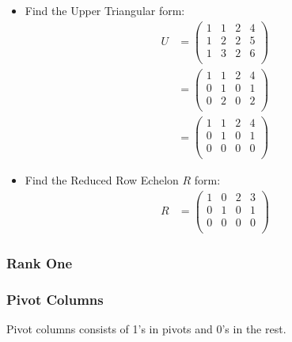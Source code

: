 \documentclass[10pt,a4paper]{article}
\begin{document}
   \begin{itemize}
	   \item Find the Upper Triangular form: 
	   \begin{align*}
        U & = \left (\begin{matrix}
			1 & 1 & 2 & 4\\ 
			1 & 2 & 2 & 5\\ 
			1 & 3 & 2 & 6\\ 
		   \end{matrix}  \right ) \\
		  & = \left (\begin{matrix}
			1 & 1 & 2 & 4\\ 
			0 & 1 & 0 & 1\\ 
			0 & 2 & 0 & 2\\ 
		   \end{matrix}  \right ) \\
		  & = \left (\begin{matrix}
			1 & 1 & 2 & 4\\ 
			0 & 1 & 0 & 1\\ 
			0 & 0 & 0 & 0\\ 
		   \end{matrix}  \right )
	\end{align*}
	\item Find the Reduced Row Echelon $R$ form:
	\begin{align*}
        R & = \left (\begin{matrix}
			1 & 0 & 2 & 3\\ 
			0 & 1 & 0 & 1\\ 
			0 & 0 & 0 & 0\\ 
		   \end{matrix}  \right )
	\end{align*}
   \end{itemize}
   \subsubsection{Rank One}
   \subsubsection{Pivot Columns}
   Pivot columns consists of 1's in pivots and 0's in the rest.
\end{document}
